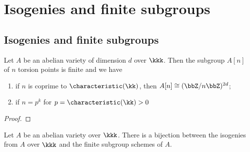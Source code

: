 \section{Isogenies and finite subgroups}

\subsection{Isogenies and finite subgroups}

    \begin{theorem}\label{thm: torsion subgroups of abelian varieties}
        Let \(A\) be an abelian variety of dimension \(d\) over \(\kkk\). 
        Then the subgroup \(A[n]\) of \(n\) torsion points is finite and we have 
        \begin{enumerate}
            \item if \(n\) is coprime to \(\characteristic(\kk)\), then \(A[n] \cong (\bbZ/n\bbZ)^{2d}\);
            \item if \(n = p^k\) for \(p = \characteristic(\kk) > 0\)
        \end{enumerate}
    \end{theorem}
    \begin{proof}
    \end{proof}

    \begin{theorem}\label{thm:isogenies_and_finite_subgroups}
        Let \(A\) be an abelian variety over \(\kkk\). 
        There is a bijection between the isogenies from \(A\) over \(\kkk\) and the finite subgroup schemes of \(A\).
    \end{theorem}